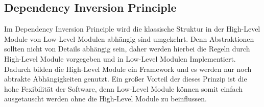 \subsection{Dependency Inversion Principle}
Im Dependency Inversion Principle wird die klassische Struktur in der High-Level Module von Low-Level Modulen abhängig sind umgekehrt.
Denn Abstraktionen sollten nicht von Details abhängig sein, daher werden hierbei die Regeln durch High-Level Module vorgegeben und in Low-Level Modulen Implementiert.
Dadurch bilden die High-Level Module ein Framework und es werden nur noch abtrakte Abhängigkeiten genutzt.
Ein großer Vorteil der dieses Prinzip ist die hohe Fexibilität der Software, denn Low-Level Module können somit einfach ausgetauscht werden ohne die High-Level Module zu beinflussen.


